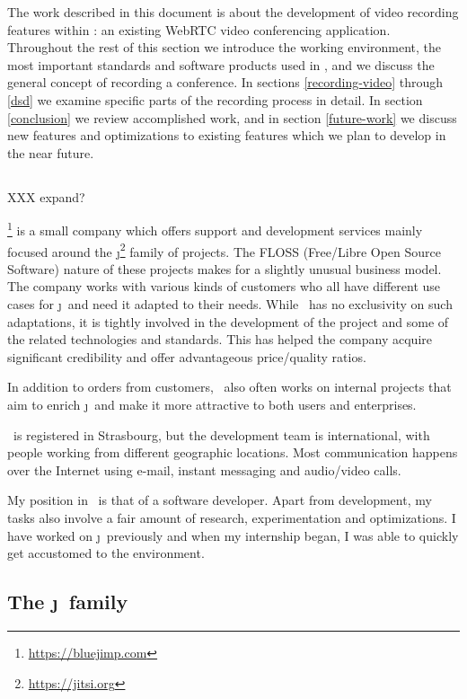\documentclass[twoside,openright,a4paper,12pt,english]{article}
\begin{document}
The work described in this document is about the development of video recording features
within \jm: an existing WebRTC video conferencing application. Throughout
the rest of this section we introduce the working environment, the most
important standards and software products used in \jm, and we discuss the
general concept of recording a conference. In sections \ref{recording-video} through \ref{dsd} we examine specific
parts of the recording process in detail. 
In section \ref{conclusion} we review accomplished work, and 
in section \ref{future-work} we
discuss new features and optimizations to existing features which we plan to
develop in the near future. 



\subsection{\bj}
XXX expand?

\bj\footnote{\url{https://bluejimp.com}} is a small company which
offers support and development services mainly focused around the
\j\footnote{\url{https://jitsi.org}}
 family of projects. The FLOSS (Free/Libre Open Source Software)
nature of these projects makes for a slightly unusual business model. The
company works with various kinds of customers who all have different use cases
for \j\ and need it adapted to their needs. While \bj\ has no exclusivity
on such adaptations, it is tightly involved in the development of the project
and some of the related technologies and standards. This has helped the company
acquire significant credibility and offer advantageous price/quality ratios.

In addition to orders from customers, \bj\ also often works on internal projects
that aim to enrich \j\ and make it more attractive to both users and
enterprises. 

\bj\ is registered in Strasbourg, but the development team is international,
with people working from different geographic locations. Most communication happens over
the Internet using e-mail, instant messaging and audio/video calls.

My position in \bj\ is that of a software developer. Apart from development, my tasks also 
involve a fair amount of research, experimentation and optimizations. I have
worked on \j\ previously and when my internship began, I was able to quickly
get accustomed to the environment. 




\subsection{The \j\ family}
\label{intro-jitsi}
\end{document}
